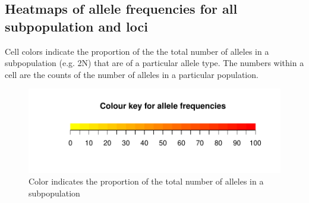 \documentclass[a4paper]{scrartcl}\usepackage[]{graphicx}\usepackage[]{color}
\makeatletter
\def\maxwidth{ %
  \ifdim\Gin@nat@width>\linewidth
    \linewidth
  \else
    \Gin@nat@width
  \fi
}
\newenvironment{knitrout}{}{} %
\makeatother
\begin{document}
\begin{knitrout}
\end{knitrout}
\FloatBarrier 
\subsection{Heatmaps of allele frequencies for all subpopulation and loci}
Cell colors indicate the proportion of the the total number of alleles in a subpopulation (e.g. 2N) that are of a particular allele type. The numbers within a cell are the counts of the number of alleles in a particular population.  


\FloatBarrier
\begin{knitrout}
\color{fgcolor}\begin{figure}
\includegraphics[width=\maxwidth]{PopGenReport_Hatchery-keyall-1} \caption[Color indicates the proportion of the total number of alleles in a subpopulation]{Color indicates the proportion of the total number of alleles in a subpopulation}\label{fig:keyall}
\end{figure}


\end{knitrout}
\end{document}
